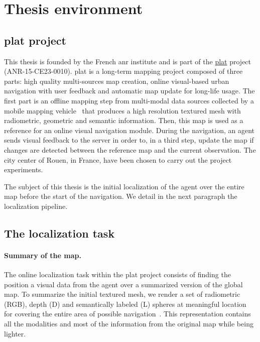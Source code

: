 \section{Thesis environment}
\label{sec:thesis_env}

\subsection{\acs*{plat} project}
\label{subsec:platinum}
This thesis is founded by the French \Ac{anr} institute and is part of the \href{http://platinum.projets.litislab.fr/}{\ac{plat}} project (ANR-15-CE23-0010). \Ac{plat} is a long-term mapping project composed of three parts: high quality multi-sources map creation, online visual-based urban navigation with user feedback and automatic map update for long-life usage. The first part is an offline mapping step from multi-modal data sources collected by a mobile mapping vehicle~\citep{Paparoditis2012,Boussaha2018,Boussaha2018a} that produces a high resolution textured mesh with radiometric, geometric and semantic information. Then, this map is used as a reference for an online visual navigation module. During the navigation, an agent sends visual feedback to the server in order to, in a third step, update the map if changes are detected between the reference map and the current observation. The city center of Rouen, in France, have been chosen to carry out the project experiments.

The subject of this thesis is the initial localization of the agent over the entire map before the start of the navigation. We detail in the next paragraph the localization pipeline.

\subsection{The localization task}
\paragraph{Summary of the map.}
The online localization task within the \ac{plat} project consists of finding the position a visual data from the agent over a summarized version of the global map. To summarize the initial textured mesh, we render a set of radiometric (RGB), depth (D) and semantically labeled (L) spheres at meaningful location for covering the entire area of possible navigation~\citep{Salah2017, Salah2018, Salah2018a}. This representation contains all the modalities and most of the information from the original map while being lighter.


